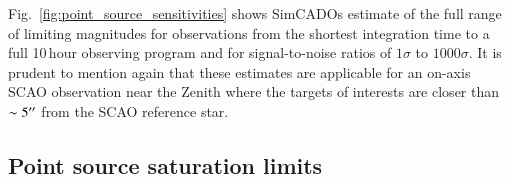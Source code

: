 Fig.~\ref{fig:point_source_sensitivities} shows SimCADOs estimate of the full range of limiting magnitudes for observations from the shortest integration time to a full 10\,hour observing program and for signal-to-noise ratios of $1\sigma$ to $1000\sigma$.
It is prudent to mention again that these estimates are applicable for an on-axis SCAO observation near the Zenith where the targets of interests are closer than $\sim5^{\prime\prime}$ from the SCAO reference star.


\subsection{Point source saturation limits}
\label{subsec:MICADO_saturation_limits}

